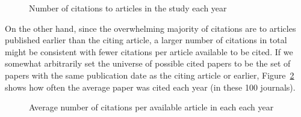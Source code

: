 \documentclass[
  10pt,
  letterpaper,
  DIV=11,
  numbers=noendperiod,
  twoside]{scrartcl}
\begin{document}
\begin{figure}


\caption{\label{fig-number-of-citations-by-year}Number of citations to
articles in the study each year}

\end{figure}%

On the other hand, since the overwhelming majority of citations are to
articles published earlier than the citing article, a larger number of
citations in total might be consistent with fewer citations per article
available to be cited. If we somewhat arbitrarily set the universe of
possible cited papers to be the set of papers with the same publication
date as the citing article or earlier,
Figure~\ref{fig-average-of-citations-by-year} shows how often the
average paper was cited each year (in these 100 journals).

\begin{figure}


\caption{\label{fig-average-of-citations-by-year}Average number of
citations per available article in each each year}

\end{figure}%
\end{document}
